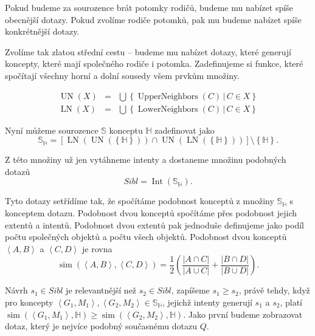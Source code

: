 \documentclass[12pt]{article}
\newcommand{\sep}{\,|\,}
\newcommand{\ssection}[1]{\subsection{#1}}
\newcommand{\sssection}[1]{\subsubsection{#1}}
\newcommand{\addk}[1]{\left(#1\right)}
\newcommand{\addh}[1]{\left[#1\right]}
\newcommand{\adds}[1]{\left\{#1\right\}}
\newcommand{\addsp}[1]{\left<#1\right>}
\DeclareMathOperator{\intfca}{Int}
\DeclareMathOperator{\lowerneighbors}{LowerNeighbors}
\DeclareMathOperator{\upperneighbors}{UpperNeighbors}
\DeclareMathOperator{\unfca}{UN}
\DeclareMathOperator{\lnfca}{LN}
\DeclareMathOperator{\simfca}{sim}
\newcommand{\alldoc}{\mathbb{D}}
\newcommand{\hledany}{\mathbb{H}}
\newcommand{\sibl}{\mathbb{S}}
\begin{document}
Pokud budeme za sourozence brát potomky rodičů, budeme mu nabízet spíše obecnější dotazy. Pokud zvolíme rodiče potomků, pak mu budeme nabízet spíše konkrétnější dotazy. 

Zvolíme tak zlatou střední cestu -- budeme mu nabízet dotazy, které generují koncepty, které mají společného rodiče i potomka. Zadefinujeme si funkce, které spočítají všechny horní a dolní sousedy všem prvkům množiny.

\begin{eqnarray}
\unfca(X)&=&\bigcup\adds{\upperneighbors(C)\sep C\in X}\\
\lnfca(X)&=&\bigcup\adds{\lowerneighbors(C)\sep C\in X}
\end{eqnarray}

Nyní můžeme sourozence $\sibl$ konceptu $\hledany$ zadefinovat jako
$$
\sibl_\hledany = \addh{\lnfca(\unfca(\adds{\hledany}))\cap\unfca(\lnfca(\adds{\hledany}))}\setminus\adds{\hledany}.
$$

Z této množiny už jen vytáhneme intenty a dostaneme množinu podobných dotazů
$$
Sibl=\intfca(\sibl_\hledany).
$$

Tyto dotazy setřídíme tak, že spočítáme podobnost konceptů z množiny $\sibl_\hledany$ s konceptem dotazu. Podobnost dvou konceptů spočítáme přes podobnost jejich extentů a intentů. Podobnost dvou extentů pak jednoduše definujeme jako podíl počtu společných objektů a počtu všech objektů. Podobnost dvou konceptů $\addsp{A, B}$ a $\addsp{C, D}$ je rovna
$$
\simfca(\addsp{A, B}, \addsp{C, D}) = \frac12\addk{\frac{|A\cap C|}{|A\cup C|} + \frac{|B\cap D|}{|B\cup D|}}.
$$

Návrh $s_1\in Sibl$ je relevantnější než $s_2\in Sibl$, zapíšeme $s_1\ge s_2$, právě tehdy, když pro koncepty $\addsp{G_1, M_1}, \addsp{G_2, M_2} \in \sibl_\hledany$, jejichž intenty generují $s_1$ a $s_2$, platí $\simfca(\addsp{G_1, M_1}, \hledany)\ge\simfca(\addsp{G_2, M_2}, \hledany)$. Jako první budeme zobrazovat dotaz, který je nejvíce podobný současnému dotazu $Q$.


\end{document}
